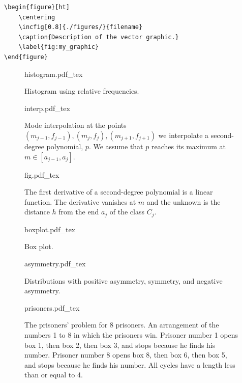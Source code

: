 \documentclass[10pt]{article}
\newcommand{\incfig}[3][1]{%
    \def\svgwidth{#1\columnwidth}
    {#3.pdf_tex}
}
\begin{document}
\begin{verbatim}
\begin{figure}[ht]
    \centering
    \incfig[0.8]{./figures/}{filename}
    \caption{Description of the vector graphic.}
    \label{fig:my_graphic}
\end{figure}
\end{verbatim}




\begin{figure}[ht]
    \centering
    \incfig[0.75]{figures/histogram/}{histogram}
    \caption{
        Histogram using relative frequencies.
        }
    \label{fig:age:histogram}
\end{figure}



\begin{figure}[ht]
    \centering
    \incfig[0.75]{figures/mode/}{interp}
    \caption{
        Mode interpolation at the points $(m_{j-1}, f_{j-1}), (m_{j}, f_{j}), (m_{j+1}, f_{j+1})$ we interpolate a second-degree polynomial, $p$.
        We assume that $p$ reaches its maximum at $m \in [a_{j-1}, a_j]$.
        }
    \label{fig:mode_interpolation}
\end{figure}


\begin{figure}[ht]
    \centering
    \incfig[0.75]{figures/mode/}{fig}
    \caption{
        The first derivative of a second-degree polynomial is a linear function.
        The derivative vanishes at $m$ and the unknown is the distance $h$ from the end $a_j$ of the class $C_j$.
    }
    \label{fig:mode_first_derivative}
\end{figure}


\begin{figure}[ht]
    \centering
    \incfig[0.75]{figures/box-plot/}{boxplot}
    \caption{
        Box plot.
    }
    \label{fig:boxplot}
\end{figure}


\begin{figure}[ht]
    \centering
    \incfig[0.9]{figures/asymmetry/}{asymmetry}
    \caption{
        Distributions with positive asymmetry, symmetry, and negative asymmetry.
    }
    \label{fig:asymmetry}
\end{figure}


\begin{figure}[ht]
    \centering
    \incfig[1]{figures/prisoners/}{prisoners}
    \caption{
        The prisoners' problem for 8 prisoners. An arrangement of the numbers 1 to 8 in which the prisoners win. 
        Prisoner number 1 opens box 1, then box 2, then box 3, and stops because he finds his number. 
        Prisoner number 8 opens box 8, then box 6, then box 5, and stops because he finds his number.
        All cycles have a length less than or equal to 4.
        }
    \label{fig:prisoners}
\end{figure}
\end{document}
